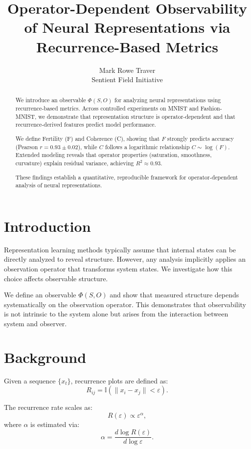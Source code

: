 \documentclass[11pt]{article}
\title{Operator-Dependent Observability of Neural Representations via Recurrence-Based Metrics}
\author{
Mark Rowe Traver \\
Sentient Field Initiative
}
\date{}
\begin{document}
\maketitle

\begin{abstract}
	We introduce an observable $\Phi(S,O)$ for analyzing neural representations using recurrence-based metrics. Across controlled experiments on MNIST and Fashion-MNIST, we demonstrate that representation structure is operator-dependent and that recurrence-derived features predict model performance.

	We define Fertility (F) and Coherence (C), showing that $F$ strongly predicts accuracy (Pearson $r=0.93 \pm 0.02$), while $C$ follows a logarithmic relationship $C \sim \log(F)$. Extended modeling reveals that operator properties (saturation, smoothness, curvature) explain residual variance, achieving $R^2 \approx 0.93$.

	These findings establish a quantitative, reproducible framework for operator-dependent analysis of neural representations.
\end{abstract}

\section{Introduction}

Representation learning methods typically assume that internal states can be directly analyzed to reveal structure. However, any analysis implicitly applies an observation operator that transforms system states. We investigate how this choice affects observable structure.

We define an observable $\Phi(S,O)$ and show that measured structure depends systematically on the observation operator. This demonstrates that observability is not intrinsic to the system alone but arises from the interaction between system and observer.

\section{Background}

Given a sequence $\{x_t\}$, recurrence plots are defined as:
\[
	R_{ij} = \mathbb{I}(\|x_i - x_j\| < \varepsilon).
\]

The recurrence rate scales as:
\[
	R(\varepsilon) \propto \varepsilon^\alpha,
\]
where $\alpha$ is estimated via:
\[
	\alpha = \frac{d \log R(\varepsilon)}{d \log \varepsilon}.
\]
\end{document}
